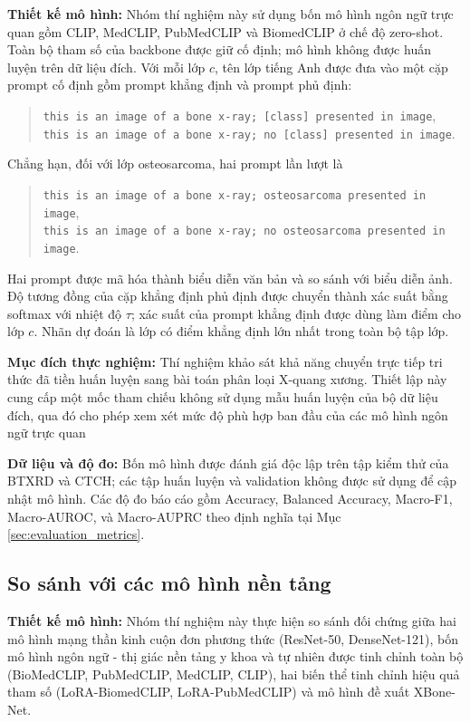 \textbf{Thiết kế mô hình:} Nhóm thí nghiệm này sử dụng bốn mô hình ngôn ngữ
trực quan gồm CLIP, MedCLIP, PubMedCLIP và BiomedCLIP ở chế độ zero-shot. Toàn
bộ tham số của backbone được giữ cố định; mô hình không được huấn luyện trên dữ liệu đích. Với mỗi lớp $c$, tên lớp tiếng Anh được đưa vào một cặp prompt cố định gồm prompt khẳng định và prompt phủ định:
\begin{quote}
\texttt{this is an image of a bone x-ray; [class] presented in image},\\
\texttt{this is an image of a bone x-ray; no [class] presented in image}.
\end{quote}
Chẳng hạn, đối với lớp osteosarcoma, hai prompt lần lượt là
\begin{quote}
\texttt{this is an image of a bone x-ray; osteosarcoma presented in image}, \\
\texttt{this is an image of a bone x-ray; no osteosarcoma presented in image}.
\end{quote}
Hai prompt được mã hóa thành biểu diễn văn bản và so sánh với biểu diễn ảnh. Độ tương đồng của cặp khẳng định phủ định được chuyển thành xác suất bằng softmax với nhiệt độ $\tau$; xác suất của prompt khẳng định được dùng làm điểm cho lớp $c$. Nhãn dự đoán là lớp có điểm khẳng định lớn nhất trong toàn bộ tập lớp.

\textbf{Mục đích thực nghiệm:} Thí nghiệm khảo sát khả năng chuyển trực tiếp
tri thức đã tiền huấn luyện sang bài toán phân loại X-quang xương. Thiết lập này cung cấp một mốc tham chiếu không sử dụng mẫu huấn luyện của bộ dữ liệu đích, qua đó cho phép xem xét mức độ phù hợp ban đầu của các mô hình ngôn ngữ trực quan

\textbf{Dữ liệu và độ đo:} Bốn mô hình được đánh giá độc lập trên tập kiểm thử của BTXRD và CTCH; các tập huấn luyện và validation không được sử dụng để cập nhật mô hình. Các độ đo báo cáo gồm Accuracy, Balanced Accuracy, Macro-F1, Macro-AUROC, và Macro-AUPRC theo định nghĩa tại Mục \ref{sec:evaluation_metrics}.

\subsection{So sánh với các mô hình nền tảng}
\label{subsec:baseline_models_comparison}

\textbf{Thiết kế mô hình:} Nhóm thí nghiệm này thực hiện so sánh đối chứng giữa hai mô hình mạng thần kinh cuộn đơn phương thức (ResNet-50, DenseNet-121), bốn mô hình ngôn ngữ - thị giác nền tảng y khoa và tự nhiên được tinh chỉnh toàn bộ (BioMedCLIP, PubMedCLIP, MedCLIP, CLIP), hai biến thể tinh chỉnh hiệu quả tham số (LoRA-BiomedCLIP, LoRA-PubMedCLIP) và mô hình đề xuất XBone-Net.

